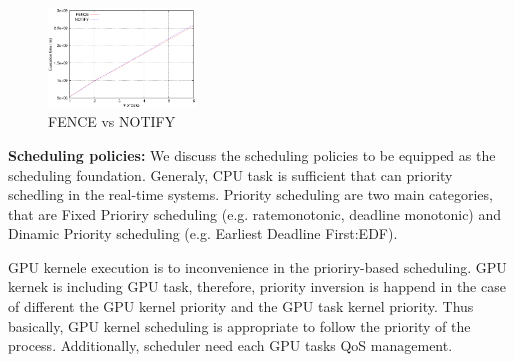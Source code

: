 \begin{figure}[t]
\begin{center}
\includegraphics[width=0.35\textwidth]{img/poll_vs_irq}
\caption{FENCE vs NOTIFY}
\end{center}
\label{fig:poll_vs_irq}
\end{figure}
\fi



\textbf{Scheduling policies:}
We discuss the scheduling policies to be equipped as the scheduling foundation.
Generaly, CPU task is sufficient that can priority schedling in the real-time systems.
Priority scheduling are two main categories, that are Fixed Prioriry scheduling (e.g. ratemonotonic, deadline monotonic) and Dinamic Priority scheduling (e.g. Earliest Deadline First:EDF).


GPU kernele execution is to inconvenience in the prioriry-based scheduling.
GPU kernek is including GPU task, therefore, priority inversion is happend in the case of different the GPU kernel priority and the GPU task kernel priority.
Thus basically, GPU kernel scheduling is appropriate to follow the priority of the process.
Additionally, scheduler need each GPU tasks QoS management.


